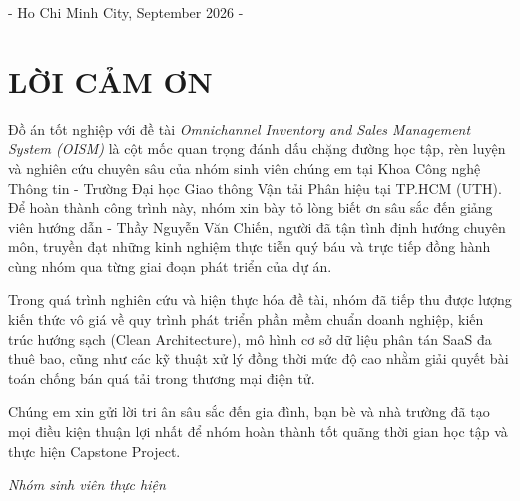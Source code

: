 \documentclass[12pt,a4paper]{report}
\begin{document}
\begin{titlepage}
		\vfill
		
		{\large - Ho Chi Minh City, September 2026 -\par}
	\end{titlepage}
	
	\chapter*{LỜI CẢM ƠN}
	Đồ án tốt nghiệp với đề tài \textit{Omnichannel Inventory and Sales Management System (OISM)} là cột mốc quan trọng đánh dấu chặng đường học tập, rèn luyện và nghiên cứu chuyên sâu của nhóm sinh viên chúng em tại Khoa Công nghệ Thông tin - Trường Đại học Giao thông Vận tải Phân hiệu tại TP.HCM (UTH). Để hoàn thành công trình này, nhóm xin bày tỏ lòng biết ơn sâu sắc đến giảng viên hướng dẫn - Thầy Nguyễn Văn Chiến, người đã tận tình định hướng chuyên môn, truyền đạt những kinh nghiệm thực tiễn quý báu và trực tiếp đồng hành cùng nhóm qua từng giai đoạn phát triển của dự án.
	
	Trong quá trình nghiên cứu và hiện thực hóa đề tài, nhóm đã tiếp thu được lượng kiến thức vô giá về quy trình phát triển phần mềm chuẩn doanh nghiệp, kiến trúc hướng sạch (Clean Architecture), mô hình cơ sở dữ liệu phân tán SaaS đa thuê bao, cũng như các kỹ thuật xử lý đồng thời mức độ cao nhằm giải quyết bài toán chống bán quá tải trong thương mại điện tử. 
	
	Chúng em xin gửi lời tri ân sâu sắc đến gia đình, bạn bè và nhà trường đã tạo mọi điều kiện thuận lợi nhất để nhóm hoàn thành tốt quãng thời gian học tập và thực hiện Capstone Project.
	
	\vspace{1.5cm}
	\begin{flushright}
		\textit{Nhóm sinh viên thực hiện}
	\end{flushright}
	
\end{document}
